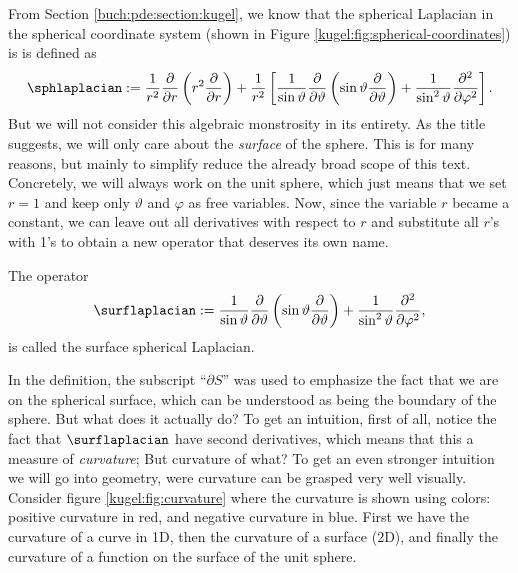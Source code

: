 From Section \ref{buch:pde:section:kugel}, we know that the spherical Laplacian
in the spherical coordinate system (shown in Figure
\ref{kugel:fig:spherical-coordinates}) is is defined as
\begin{equation*}
    \sphlaplacian :=
      \frac{1}{r^2} \frac{\partial}{\partial r} \left(
        r^2 \frac{\partial}{\partial r}
      \right)
      + \frac{1}{r^2} \left[
          \frac{1}{\sin\vartheta} \frac{\partial}{\partial \vartheta} \left(
            \sin\vartheta \frac{\partial}{\partial\vartheta}
          \right)
        + \frac{1}{\sin^2 \vartheta} \frac{\partial^2}{\partial\varphi^2}
      \right].
\end{equation*}
But we will not consider this algebraic monstrosity in its entirety. As the
title suggests, we will only care about the \emph{surface} of the sphere.  This
is for many reasons, but mainly to simplify reduce the already broad scope of
this text. Concretely, we will always work on the unit sphere, which just means
that we set $r = 1$ and keep only $\vartheta$ and $\varphi$ as free variables.
Now, since the variable $r$ became a constant, we can leave out all derivatives
with respect to $r$ and substitute all $r$'s with 1's to obtain a new operator
that deserves its own name.

\begin{definition}
  \label{kugel:def:surface-laplacian}
  The operator
  \begin{equation*}
      \surflaplacian :=
        \frac{1}{\sin\vartheta} \frac{\partial}{\partial \vartheta} \left(
          \sin\vartheta \frac{\partial}{\partial\vartheta}
        \right)
        + \frac{1}{\sin^2 \vartheta} \frac{\partial^2}{\partial\varphi^2},
  \end{equation*}
  is called the surface spherical Laplacian.
\end{definition}

In the definition, the subscript ``$\partial S$'' was used to emphasize the fact
that we are on the spherical surface, which can be understood as being the
boundary of the sphere. But what does it actually do? To get an intuition, first
of all, notice the fact that $\surflaplacian$ have second derivatives, which
means that this a measure of \emph{curvature}; But curvature of what? To get an
even stronger intuition we will go into geometry, were curvature can be grasped
very well visually. Consider figure \ref{kugel:fig:curvature} where the
curvature is shown using colors: positive curvature in red, and negative
curvature in blue. First we have the curvature of a curve in 1D, then the
curvature of a surface (2D), and finally the curvature of a function on the
surface of the unit sphere.

